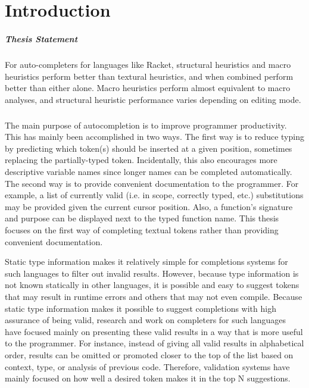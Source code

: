 \documentclass[ms,electronic,twosidetoc,letterpaper,chaptercenter,parttop,lol,lof,lot]{byumsphd}
\title{\Title}
\author{\Author}
\begin{document}
\maketitle
{}

\chapter{Introduction}

\paragraph{Thesis Statement} For auto-completers for languages like Racket, structural
heuristics and macro heuristics perform better than textural heuristics, and when combined
perform better than either alone. Macro heuristics perform almost equivalent to macro
analyses, and structural heuristic performance varies depending on editing mode.

\paragraph{} The main purpose of autocompletion is to improve programmer productivity.
This has mainly been accomplished in two ways. The first way is to reduce typing by
predicting which token(s) should be inserted at a given position, sometimes replacing the
partially-typed token. Incidentally, this also encourages more descriptive variable names
since longer names can be completed automatically. The second way is to provide convenient
documentation to the programmer. For example, a list of currently valid (i.e. in scope,
correctly typed, etc.) substitutions may be provided given the current cursor position.
Also, a function's signature and purpose can be displayed next to the typed function name.
This thesis focuses on the first way of completing textual tokens rather than providing
convenient documentation.

Static type information makes it relatively simple for completions systems for such
languages to filter out invalid results. However, because type information is not known
statically in other languages, it is possible and easy to suggest tokens that may result
in runtime errors and others that may not even compile. Because static type information
makes it possible to suggest completions with high assurance of being valid, research and
work on completers for such languages have focused mainly on presenting these valid
results in a way that is more useful to the programmer. For instance, instead of giving
all valid results in alphabetical order, results can be omitted or promoted closer to the
top of the list based on context, type, or analysis of previous code. Therefore,
validation systems have mainly focused on how well a desired token makes it in the top N
suggestions.
\end{document}
